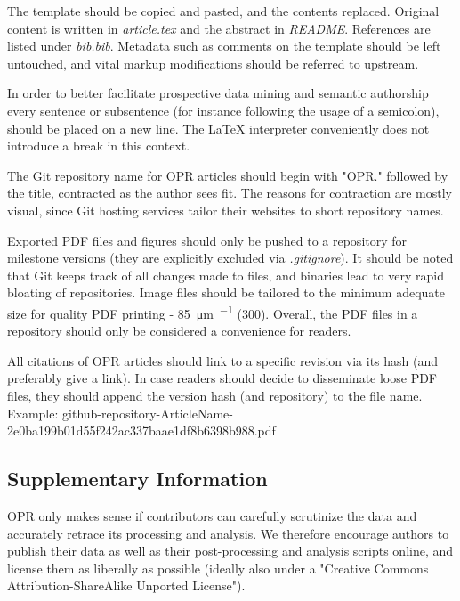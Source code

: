 The template should be copied and pasted, and the contents replaced.
Original content is written in \textit{article.tex} and the abstract in \textit{README}. References are listed under \textit{bib.bib}.
Metadata such as comments on the template should be left untouched, and vital markup modifications should be referred to upstream.

In order to better facilitate prospective data mining and semantic authorship every sentence or subsentence (for instance following the usage of a semicolon), should be placed on a new line.
The LaTeX interpreter conveniently does not introduce a break in this context.

The Git repository name for OPR articles should begin with "OPR." followed by the title, contracted as the author sees fit.
The reasons for contraction are mostly visual, since Git hosting services tailor their websites to short repository names.

Exported PDF files and figures should only be pushed to a repository for milestone versions
(they are explicitly excluded via \textit{.gitignore}).
It should be noted that Git keeps track of all changes made to files, and binaries lead to very rapid bloating of repositories.
Image files should be tailored to the minimum adequate size for quality PDF printing - \SI{85}{\micro\meter\per{}} (\SI{300}{}).
Overall, the PDF files in a repository should only be considered a convenience for readers.

All citations of OPR articles should link to a specific revision via its hash (and preferably give a link).
In case readers should decide to disseminate loose PDF files, they should append the version hash (and repository) to the file name.
Example: \textcolor{Aubergine}{github-repository-ArticleName-2e0ba199b01d55f242ac337baae1df8b6398b988.pdf}
\subsection{Supplementary Information}
OPR only makes sense if contributors can carefully scrutinize the data and accurately retrace its processing and analysis. 
We therefore encourage authors to publish their data as well as their post-processing and analysis scripts online,
and license them as liberally as possible (ideally also under a "Creative Commons Attribution-ShareAlike Unported License").

